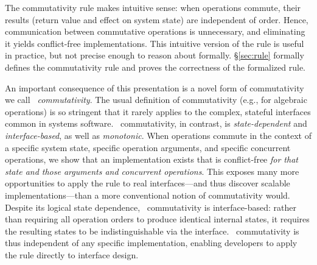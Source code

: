 The commutativity rule makes
intuitive sense: when operations commute, their
results (return value and effect on system state) are independent of order.
Hence, communication between commutative operations is
unnecessary, and eliminating it yields conflict-free implementations.
%
This intuitive version of the rule is useful in practice, but
not precise enough to reason
about formally.
%
\S\ref{sec:rule} formally defines the commutativity rule and proves
the correctness of the formalized rule.

An important consequence of this presentation is a novel form of
commutativity we call \emph{\SIM\ commutativity}.
%
The usual definition of commutativity (e.g., for algebraic operations)
is so stringent that it rarely applies to the complex, stateful
interfaces common in systems software.
%
\SIM\ commutativity, in contrast, is \emph{state-dependent} and
\emph{interface-based}, as well as \emph{monotonic}.
%
%
When operations commute in the context of a specific system state,
specific operation arguments, and specific concurrent operations, we
show that an implementation exists that is conflict-free \emph{for that state
  and those arguments and concurrent operations}.
%
This exposes many more opportunities to apply the rule to real
interfaces---and thus discover scalable implementations---than a more
conventional notion of commutativity would.
%
Despite its logical state dependence, \SIM\ commutativity is
interface-based: rather than requiring all operation orders to produce
identical internal states, it requires the resulting states to be
indistinguishable via the interface.
%
\SIM\ commutativity is thus independent of any specific
implementation, enabling developers to apply the rule directly to
interface design.




